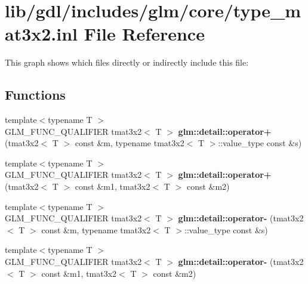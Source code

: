 \hypertarget{type__mat3x2_8inl}{}\section{lib/gdl/includes/glm/core/type\+\_\+mat3x2.inl File Reference}
\label{type__mat3x2_8inl}
This graph shows which files directly or indirectly include this file\+:
\subsection*{Functions}
\begin{DoxyCompactItemize}
\item 
\hypertarget{namespaceglm_1_1detail_aaeb82124fa2780bfad15998b5477a608}{}{\footnotesize template$<$typename T $>$ }\\G\+L\+M\+\_\+\+F\+U\+N\+C\+\_\+\+Q\+U\+A\+L\+I\+F\+I\+E\+R tmat3x2$<$ T $>$ {\bfseries glm\+::detail\+::operator+} (tmat3x2$<$ T $>$ const \&m, typename tmat3x2$<$ T $>$\+::value\+\_\+type const \&s)\label{namespaceglm_1_1detail_aaeb82124fa2780bfad15998b5477a608}

\item 
\hypertarget{namespaceglm_1_1detail_a8e53f62ae79a8147b4206cfa062535bf}{}{\footnotesize template$<$typename T $>$ }\\G\+L\+M\+\_\+\+F\+U\+N\+C\+\_\+\+Q\+U\+A\+L\+I\+F\+I\+E\+R tmat3x2$<$ T $>$ {\bfseries glm\+::detail\+::operator+} (tmat3x2$<$ T $>$ const \&m1, tmat3x2$<$ T $>$ const \&m2)\label{namespaceglm_1_1detail_a8e53f62ae79a8147b4206cfa062535bf}

\item 
\hypertarget{namespaceglm_1_1detail_ae8e1ecfab5b3bd15776ab76abc60b996}{}{\footnotesize template$<$typename T $>$ }\\G\+L\+M\+\_\+\+F\+U\+N\+C\+\_\+\+Q\+U\+A\+L\+I\+F\+I\+E\+R tmat3x2$<$ T $>$ {\bfseries glm\+::detail\+::operator-\/} (tmat3x2$<$ T $>$ const \&m, typename tmat3x2$<$ T $>$\+::value\+\_\+type const \&s)\label{namespaceglm_1_1detail_ae8e1ecfab5b3bd15776ab76abc60b996}

\item 
\hypertarget{namespaceglm_1_1detail_a69a98ef51c37cfce018d17d1edc61283}{}{\footnotesize template$<$typename T $>$ }\\G\+L\+M\+\_\+\+F\+U\+N\+C\+\_\+\+Q\+U\+A\+L\+I\+F\+I\+E\+R tmat3x2$<$ T $>$ {\bfseries glm\+::detail\+::operator-\/} (tmat3x2$<$ T $>$ const \&m1, tmat3x2$<$ T $>$ const \&m2)\label{namespaceglm_1_1detail_a69a98ef51c37cfce018d17d1edc61283}


\end{DoxyCompactItemize}
